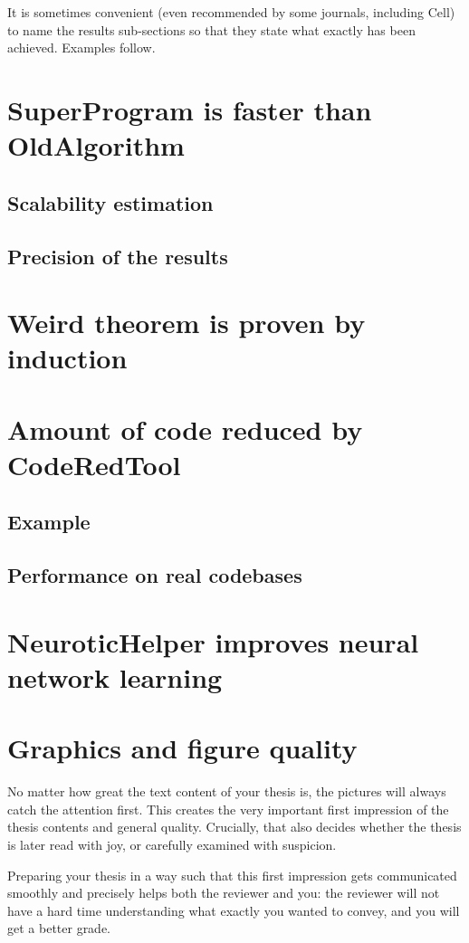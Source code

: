 It is sometimes convenient (even recommended by some journals, including Cell) to name the results sub-sections so that they state what exactly has been achieved. Examples follow.

\section{SuperProgram is faster than OldAlgorithm}
\subsection{Scalability estimation}
\subsection{Precision of the results}
\section{Weird theorem is proven by induction}
\section{Amount of code reduced by CodeRedTool}
\subsection{Example}
\subsection{Performance on real codebases}
\section{\sloppy NeuroticHelper improves neural network learning}

\section{Graphics and figure quality}

No matter how great the text content of your thesis is, the pictures will always catch the attention first. This creates the very important first impression of the thesis contents and general quality. Crucially, that also decides whether the thesis is later read with joy, or carefully examined with suspicion.

Preparing your thesis in a way such that this first impression gets communicated smoothly and precisely helps both the reviewer and you: the reviewer will not have a hard time understanding what exactly you wanted to convey, and you will get a better grade.

